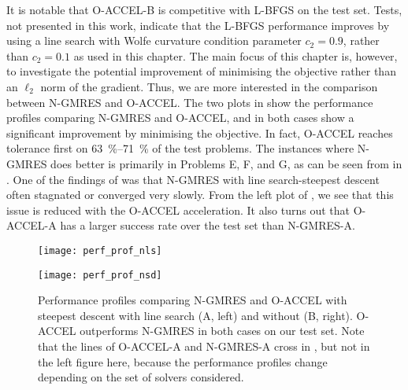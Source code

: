 \documentclass[main.tex]{subfiles}
\begin{document}
It is notable that O-ACCEL-B is competitive with L-BFGS on the test
set. Tests, not presented in this work, indicate that the L-BFGS
performance improves by using a line search with Wolfe curvature
condition parameter $c_2=0.9$, rather than $c_2=0.1$ as used in this
chapter.  The main focus of this chapter is, however, to
investigate the potential improvement of minimising the objective
rather than an $\ell_2$ norm of the gradient. Thus, we are more
interested in the comparison between N-GMRES and O-ACCEL.  The two
plots in  show the performance profiles
comparing N-GMRES and O-ACCEL, and in both cases show a significant
improvement by minimising the objective. In fact, O-ACCEL reaches
tolerance first on \SIrange{63}{71}{\percent} of the test problems.
The instances where N-GMRES does better is primarily in Problems E, F,
and G, as can be seen from  in .  One of
the findings of \citet{sterck2013steepest} was that N-GMRES with line
search-steepest descent often stagnated or converged very slowly. From
the left plot of , we see that this issue
is reduced with the O-ACCEL acceleration. It also turns out that
O-ACCEL-A has a larger success rate over the test set than N-GMRES-A.
\begin{figure}[hbt]
  \centering
  \begin{minipage}{0.49\textwidth}
    \texttt{[image: perf\_prof\_nls]}
  \end{minipage}
  \hfill
  \begin{minipage}{0.49\textwidth}
    \texttt{[image: perf\_prof\_nsd]}
  \end{minipage}
  \caption{Performance profiles comparing N-GMRES and O-ACCEL with
    steepest descent with line search (A, left) and without (B,
    right).  O-ACCEL outperforms N-GMRES in both cases on our test
    set.
    Note that the lines of O-ACCEL-A and N-GMRES-A cross in
    , but not in the left figure here, because
    the performance profiles change depending on the set of solvers
    considered.
  }\label{fig:perf_prof_nls_nsd}
\end{figure}
\end{document}
